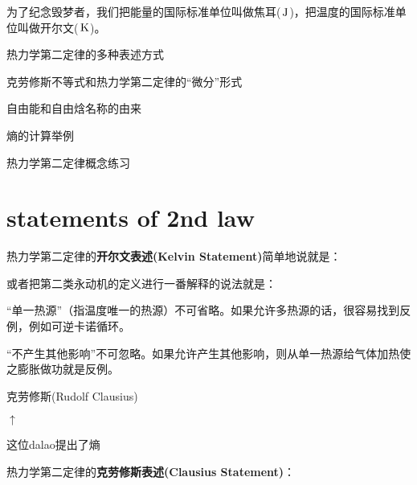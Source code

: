 \documentclass[CJK]{beamer}
\begin{document}
\begin{frame}
\bch
{}

为了纪念毁梦者，我们把能量的国际标准单位叫做焦耳($\,\mathrm{J}$)，把温度的国际标准单位叫做开尔文($\,\mathrm{K}$)。
\ech
\end{frame}

\begin{frame}
\bch
\bitem
\item{热力学第二定律的多种表述方式}
\item{克劳修斯不等式和热力学第二定律的“微分”形式}
\item{自由能和自由焓名称的由来}
\item{熵的计算举例}
\item{热力学第二定律概念练习}
\eitem
\ech
\end{frame}

\section{statements of 2nd law}


\begin{frame}
\bch
热力学第二定律的{\bf 开尔文表述(Kelvin Statement)}简单地说就是：

或者把第二类永动机的定义进行一番解释的说法就是：
\ech
\end{frame}

\begin{frame}
\bch
\bitem
\item{“单一热源”（指温度唯一的热源）不可省略。如果允许多热源的话，很容易找到反例，例如可逆卡诺循环。}
\item{“不产生其他影响”不可忽略。如果允许产生其他影响，则从单一热源给气体加热使之膨胀做功就是反例。}
\eitem

\ech
\end{frame}

\begin{frame}
\bch

\bcenter
克劳修斯(Rudolf Clausius)
\ecenter


\bcenter
$\uparrow$

这位dalao提出了熵
\ecenter
\ech
\end{frame}

\begin{frame}
\bch
热力学第二定律的{\bf 克劳修斯表述(Clausius Statement)}：
\ech
\end{frame}
\end{document}
